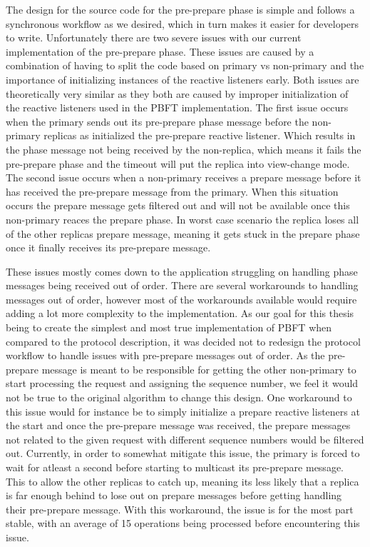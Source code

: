 The design for the source code for the pre-prepare phase is simple and follows a synchronous workflow as we desired, which in turn makes it easier for developers to write. Unfortunately there are two severe issues with our current implementation of the pre-prepare phase. These issues are caused by a combination of having to split the code based on primary vs non-primary and the importance of initializing instances of the reactive listeners early. Both issues are theoretically very similar as they both are caused by improper initialization of the reactive listeners used in the PBFT implementation. The first issue occurs when the primary sends out its pre-prepare phase message before the non-primary replicas as initialized the pre-prepare reactive listener. Which results in the phase message not being received by the non-replica, which means it fails the pre-prepare phase and the timeout will put the replica into view-change mode. The second issue occurs when a non-primary receives a prepare message before it has received the pre-prepare message from the primary. When this situation occurs the prepare message gets filtered out and will not be available once this non-primary reaces the prepare phase. In worst case scenario the replica loses all of the other replicas prepare message, meaning it gets stuck in the prepare phase once it finally receives its pre-prepare message.

These issues mostly comes down to the application struggling on handling phase messages being received out of order. There are several workarounds to handling messages out of order, however most of the workarounds available would require adding a lot more complexity to the implementation. As our goal for this thesis being to create the simplest and most true implementation of PBFT when compared to the protocol description, it was decided not to redesign the protocol workflow to handle issues with pre-prepare messages out of order. As the pre-prepare message is meant to be responsible for getting the other non-primary to start processing the request and assigning the sequence number, we feel it would not be true to the original algorithm to change this design. One workaround to this issue would for instance be to simply initialize a prepare reactive listeners at the start and once the pre-prepare message was received, the prepare messages not related to the given request with different sequence numbers would be filtered out. Currently, in order to somewhat mitigate this issue, the primary is forced to wait for atleast a second before starting to multicast its pre-prepare message. This to allow the other replicas to catch up, meaning its less likely that a replica is far enough behind to lose out on prepare messages before getting handling their pre-prepare message. With this workaround, the issue is for the most part stable, with an average of 15 operations being processed before encountering this issue.

